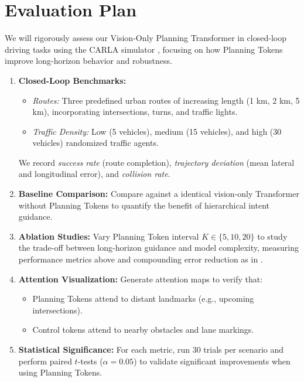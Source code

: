 \documentclass[11pt,a4paper]{article}
\begin{document}
\section*{Evaluation Plan}

We will rigorously assess our Vision-Only Planning Transformer in closed-loop driving tasks using the CARLA simulator \cite{DBLP:journals/corr/abs-1711-03938}, focusing on how Planning Tokens improve long-horizon behavior and robustness.

\begin{enumerate}
    \item \textbf{Closed-Loop Benchmarks:}
          \begin{itemize}
              \item \emph{Routes:} Three predefined urban routes of increasing length (1 km, 2 km, 5 km), incorporating intersections, turns, and traffic lights.
              \item \emph{Traffic Density:} Low (5 vehicles), medium (15 vehicles), and high (30 vehicles) randomized traffic agents.
          \end{itemize}
          We record \emph{success rate} (route completion), \emph{trajectory deviation} (mean lateral and longitudinal error), and \emph{collision rate}.

    \item \textbf{Baseline Comparison:}
          Compare against a identical vision-only Transformer without Planning Tokens to quantify the benefit of hierarchical intent guidance.

    \item \textbf{Ablation Studies:}
          Vary Planning Token interval \(K\in\{5,10,20\}\) to study the trade-off between long-horizon guidance and model complexity, measuring performance metrics above and compounding error reduction as in \cite{clinton2024planningtransformerlonghorizonoffline}.

    \item \textbf{Attention Visualization:}
          Generate attention maps to verify that:
          \begin{itemize}
              \item Planning Tokens attend to distant landmarks (e.g., upcoming intersections).
              \item Control tokens attend to nearby obstacles and lane markings.
          \end{itemize}

    \item \textbf{Statistical Significance:}
          For each metric, run 30 trials per scenario and perform paired \(t\)-tests (\(\alpha=0.05\)) to validate significant improvements when using Planning Tokens.
\end{enumerate}
\end{document}
